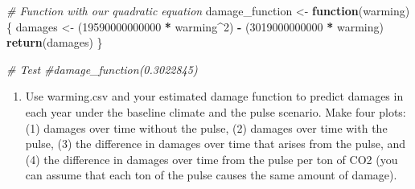 \documentclass[
]{article}
\newenvironment{Shaded}{\begin{snugshade}}{\end{snugshade}}
\newcommand{\CommentTok}[1]{\textcolor[rgb]{0.56,0.35,0.01}{\textit{#1}}}
\newcommand{\ControlFlowTok}[1]{\textcolor[rgb]{0.13,0.29,0.53}{\textbf{#1}}}
\newcommand{\DataTypeTok}[1]{\textcolor[rgb]{0.13,0.29,0.53}{#1}}
\newcommand{\DecValTok}[1]{\textcolor[rgb]{0.00,0.00,0.81}{#1}}
\newcommand{\KeywordTok}[1]{\textcolor[rgb]{0.13,0.29,0.53}{\textbf{#1}}}
\newcommand{\NormalTok}[1]{#1}
\newcommand{\OperatorTok}[1]{\textcolor[rgb]{0.81,0.36,0.00}{\textbf{#1}}}
\newcommand{\StringTok}[1]{\textcolor[rgb]{0.31,0.60,0.02}{#1}}
\providecommand{\tightlist}{%
  \setlength{\itemsep}{0pt}\setlength{\parskip}{0pt}}
\begin{document}
\begin{Shaded}
\end{Shaded}

\begin{Shaded}
\begin{Highlighting}[]
\CommentTok{# Function with our quadratic equation}
\NormalTok{damage_function <-}\StringTok{ }\ControlFlowTok{function}\NormalTok{(warming) \{}
\NormalTok{  damages <-}\StringTok{ }\NormalTok{(}\DecValTok{19590000000000} \OperatorTok{*}\StringTok{ }\NormalTok{warming}\OperatorTok{^}\DecValTok{2}\NormalTok{) }\OperatorTok{-}\StringTok{ }\NormalTok{(}\DecValTok{3019000000000} \OperatorTok{*}\StringTok{ }\NormalTok{warming)}
  \KeywordTok{return}\NormalTok{(damages)}
\NormalTok{\}}

\CommentTok{# Test}
\CommentTok{#damage_function(0.3022845)}
\end{Highlighting}
\end{Shaded}

\begin{enumerate}
\def\labelenumi{\arabic{enumi}.}
\setcounter{enumi}{1}
\tightlist
\item
  Use warming.csv and your estimated damage function to predict damages
  in each year under the baseline climate and the pulse scenario. Make
  four plots: (1) damages over time without the pulse, (2) damages over
  time with the pulse, (3) the difference in damages over time that
  arises from the pulse, and (4) the difference in damages over time
  from the pulse per ton of CO2 (you can assume that each ton of the
  pulse causes the same amount of damage).
\end{enumerate}
\end{document}
